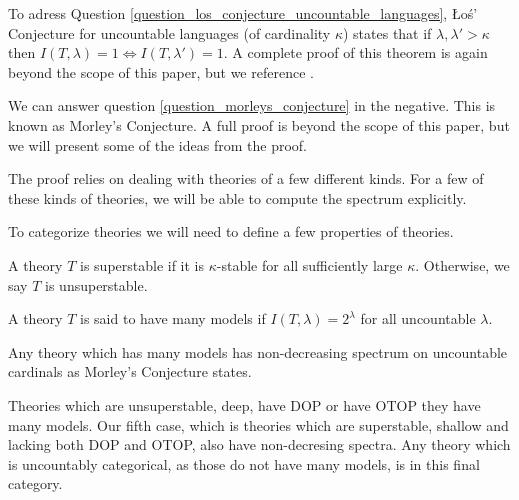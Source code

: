 
To adress Question \ref{question_los_conjecture_uncountable_languages}, \L o\'s' Conjecture for uncountable languages (of cardinality \(\kappa\)) states that if \(\lambda, \lambda' >\kappa\) then \(I(T, \lambda) = 1 \iff I(T, \lambda') = 1\). 
A complete proof of this theorem is again beyond the scope of this paper, but we reference \cite{shelahUncountable}.

We can answer question \ref{question_morleys_conjecture} in the negative. This is known as Morley's Conjecture. A full proof is beyond the scope of this paper, but we will present some of the ideas from the proof. 

The proof relies on dealing with theories of a few different kinds.\cite{hart}
For a few of these kinds of theories, we will be able to compute the spectrum explicitly.

To categorize theories we will need to define a few properties of theories. 

\begin{definition}\label{definition_superstable}
A theory \(T\) is superstable if it is \(\kappa\)-stable for all sufficiently large \(\kappa\). Otherwise, we say \(T\) is unsuperstable. 
\end{definition}

%
%
%
%

\begin{definition}\label{definition_many_models}
A theory \(T\) is said to have many models if \(I(T, \lambda) = 2^\lambda\) for all uncountable \(\lambda\). 
\end{definition}

Any theory which has many models has non-decreasing spectrum on uncountable cardinals as Morley's Conjecture states. 

Theories which are unsuperstable, deep, have DOP or have OTOP they have many models. 
Our fifth case, which is theories which are superstable, shallow and lacking both DOP and OTOP, also have non-decresing spectra. 
Any theory which is uncountably categorical, as those do not have many models, is in this final category. 





